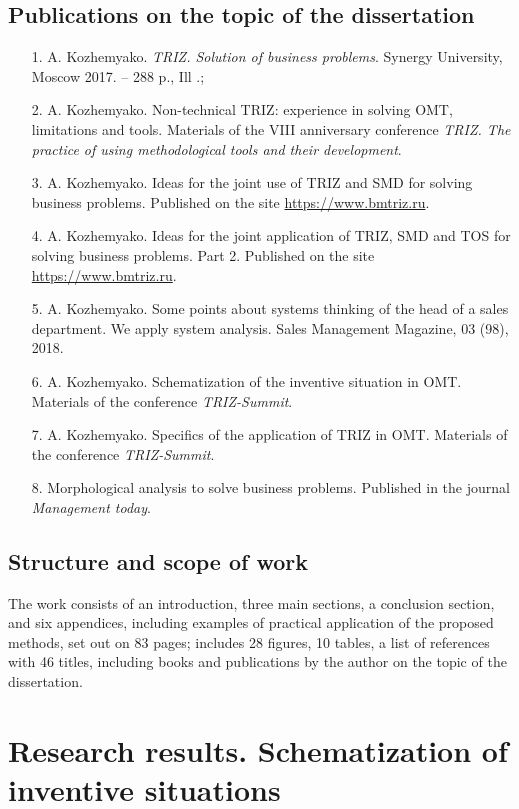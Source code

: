 \documentclass[11pt,a4paper]{book}
\begin{document}
\section{Publications on the topic of the dissertation}
\begin{itemize}
\item[1.] A. Kozhemyako. \emph{TRIZ. Solution of business problems}. 
  Synergy University, Moscow 2017. -- 288 p., Ill .;
\item[2.] A. Kozhemyako. Non-technical TRIZ: experience in solving
  OMT, limitations and tools. Materials of the
  VIII anniversary conference \emph{TRIZ. The practice of using methodological
    tools and their development}.
\item[3.] A. Kozhemyako. Ideas for the joint use of TRIZ and SMD for solving
  business problems. Published on the site \url{https://www.bmtriz.ru}.
\item[4.] A. Kozhemyako. Ideas for the joint application of TRIZ, SMD and TOS
  for solving business problems.  Part 2. Published on the site
  \url{https://www.bmtriz.ru}.
\item[5.] A. Kozhemyako. Some points about systems thinking of the head of a
  sales department.  We apply system analysis. Sales Management Magazine, 03
  (98), 2018.
\item[6.] A. Kozhemyako. Schematization of the inventive situation in
  OMT. Materials of the conference
  \emph{TRIZ-Summit}.
\item[7.] A. Kozhemyako. Specifics of the application of TRIZ in
  OMT. Materials of the conference
  \emph{TRIZ-Summit}.
\item[8.] Morphological analysis to solve business problems. Published in the
  journal \emph{Management today}.
\end{itemize}

\section{Structure and scope of work}
The work consists of an introduction, three main sections, a conclusion
section, and six appendices, including examples of practical application of
the proposed methods, set out on 83 pages; includes 28 figures, 10 tables, a
list of references with 46 titles, including books and publications by the
author on the topic of the dissertation.

\chapter[Research Results]{Research results.
  Schematization of inventive situations}
\end{document}
